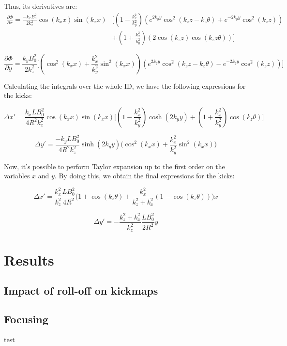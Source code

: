 \documentclass{article}
\begin{document}
Thus, its derivatives are:
\begin{equation}
\begin{split}
\frac{\partial\Phi}{\partial x} = \frac{-k_xB_0^2}{2k_z^2}\cos(k_xx)\sin(k_xx) & \bigg[\left(1-\frac{k_x^2}{k_y^2}\right)\left(e^{2k_yy}\cos^2(k_zz-k_z\theta) + e^{-2k_yy}\cos^2(k_zz)\right) \\
 & + \left(1+\frac{k_x^2}{k_y^2}\right)\left(2\cos(k_zz)\cos(k_zz\theta)\right)\bigg]
\end{split}
\end{equation}

\begin{equation}
\frac{\partial\Phi}{\partial y} = \frac{k_yB_0^2}{2k_z^2}\bigg[\left(\cos^2(k_xx)+\frac{k_x^2}{k_y^2}\sin^2(k_xx)\right)\left(e^{2k_yy}\cos^2(k_zz-k_z\theta) - e^{-2k_yy}\cos^2(k_zz)\right)\bigg]
\end{equation}
 
Calculating the integrals over the whole ID, we have the following expressions for the kicks:

\begin{equation}
\Delta x' = \frac{k_xLB_0^2}{4R^2k_z^2}\cos(k_xx)\sin(k_xx)\bigg[\left(1-\frac{k_x^2}{k_y^2}\right)\cosh(2k_yy) + \left(1+\frac{k_x^2}{k_y^2}\right)\cos(k_z\theta) \bigg]
\end{equation}


\begin{equation}
\Delta y' = \frac{-k_yLB_0^2}{4R^2k_z^2}\sinh(2k_yy)\bigg(\cos^2(k_xx)+\frac{k_x^2}{k_y^2}\sin^2(k_xx)\bigg)
\end{equation}


Now, it's possible to perform Taylor expansion up to the first order on the variables $x$ and $y$. By doing this, we obtain the final expressions for the kicks:

\begin{equation}
\Delta x' = \frac{k_x^2}{k_z^2}\frac{LB_0^2}{4R^2}\bigg(1+\cos(k_z\theta)+\frac{k_x^2}{k_z^2+k_x^2}\left(1-\cos(k_z\theta)\right)\bigg)x
\end{equation}

\begin{equation}
\Delta y' = -\frac{k_z^2+k_x^2}{k_z^2}\frac{LB_0^2}{2R^2}y
\end{equation}

\section{Results}
\subsection{Impact of roll-off on kickmaps}

\subsection{Focusing}
test
\end{document}
